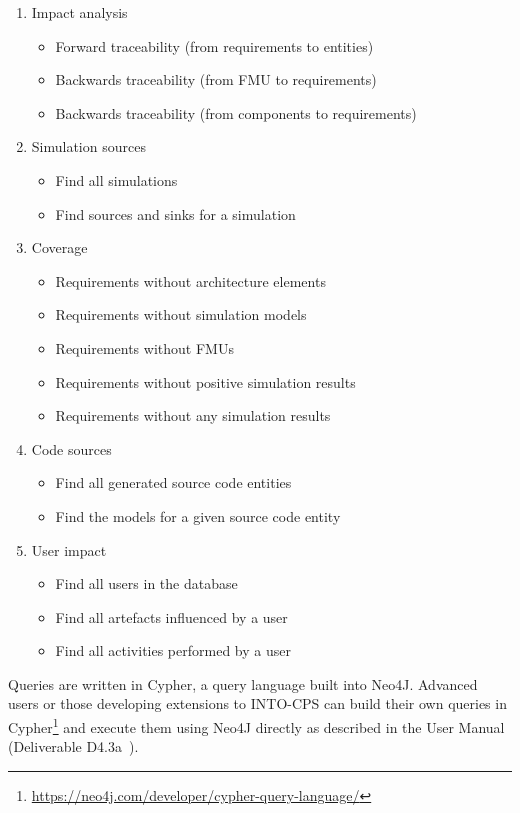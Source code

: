 \begin{enumerate}[noitemsep]
  \item Impact analysis
  \begin{itemize}
    \item Forward traceability (from requirements to entities)
    \item Backwards traceability (from FMU to requirements)
    \item Backwards traceability (from components to requirements)
  \end{itemize}
  \item Simulation sources
  \begin{itemize}
    \item Find all simulations
    \item Find sources and sinks for a simulation
  \end{itemize}
  \item Coverage
  \begin{itemize}
    \item Requirements without architecture elements
    \item Requirements without simulation models
    \item Requirements without FMUs
    \item Requirements without positive simulation results
    \item Requirements without any simulation results
  \end{itemize}
  \item Code sources
  \begin{itemize}
    \item Find all generated source code entities
    \item Find the models for a given source code entity
  \end{itemize}
  \item User impact
  \begin{itemize}
    \item Find all users in the database
    \item Find all artefacts influenced by a user
    \item Find all activities performed by a user
  \end{itemize}
\end{enumerate}

Queries are written in Cypher, a query language built into Neo4J. Advanced users or those developing extensions to INTO-CPS can build their own queries in Cypher\footnote{\url{https://neo4j.com/developer/cypher-query-language/}} and execute them using Neo4J directly as described in the User Manual (Deliverable D4.3a~\cite{INTOCPSD4.3a}). 